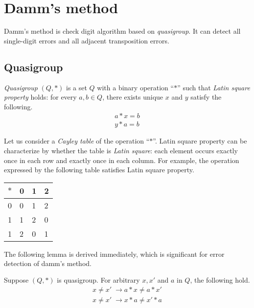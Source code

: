 \chapter{Damm's method}

Damm's method is check digit algorithm based on 
\emph{quasigroup}.
It can detect all single-digit errors and all adjacent transposition errors.

\section{Quasigroup}

\emph{Quasigroup} $(Q,*)$ is a set $Q$ with a binary operation ``$*$''
such that  \emph{ Latin square property} holds:
for every $a,b \in Q$, there exists unique $x$ and $y$ satisfy the following.
\begin{align*}
 a*x = b\\
 y*a = b
\end{align*}

Let us consider a \emph{Cayley table} of the operation ``$*$''.
Latin square property can be characterize by whether 
the table is \emph{Latin square}:
each element occurs exactly once in each row and exactly once in each column.
For example, the operation expressed by the following table
satisfies Latin square property.
\begin{center}
\begin{tabular}{| l || l | l | l |}
\hline
$*$& 0 & 1 & 2\\
\hline\hline
0   & 0 & 1 & 2\\
\hline
1   & 1 & 2 & 0 \\
\hline
1   & 2 & 0 & 1 \\
\hline
\end{tabular}
 \end{center}

The following lemma is derived immediately,
which is significant for error detection  of 
damm's method.
\begin{lemma}
 Suppose $(Q,*)$ is quasigroup.
 For arbitrary $x,x'$ and $a$ in $Q$, the following hold.
\begin{align*}
 x \neq x'\; \rightarrow a*x \neq a*x' \\
 x \neq x'\; \rightarrow x*a \neq x'*a
 \end{align*}
\end{lemma}


